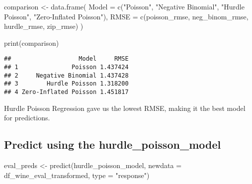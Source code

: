 \documentclass[
]{article}
\newenvironment{Shaded}{\begin{snugshade}}{\end{snugshade}}
\newcommand{\AttributeTok}[1]{\textcolor[rgb]{0.77,0.63,0.00}{#1}}
\newcommand{\FunctionTok}[1]{\textcolor[rgb]{0.00,0.00,0.00}{#1}}
\newcommand{\NormalTok}[1]{#1}
\newcommand{\OtherTok}[1]{\textcolor[rgb]{0.56,0.35,0.01}{#1}}
\newcommand{\StringTok}[1]{\textcolor[rgb]{0.31,0.60,0.02}{#1}}
\begin{document}
\begin{Shaded}
\begin{Highlighting}[]
\NormalTok{comparison }\OtherTok{\textless{}{-}} \FunctionTok{data.frame}\NormalTok{(}
  \AttributeTok{Model =} \FunctionTok{c}\NormalTok{(}\StringTok{"Poisson"}\NormalTok{, }\StringTok{"Negative Binomial"}\NormalTok{, }\StringTok{"Hurdle Poisson"}\NormalTok{, }\StringTok{"Zero{-}Inflated Poisson"}\NormalTok{),}
  \AttributeTok{RMSE =} \FunctionTok{c}\NormalTok{(poisson\_rmse, neg\_binom\_rmse, hurdle\_rmse, zip\_rmse)}
\NormalTok{)}

\FunctionTok{print}\NormalTok{(comparison)}
\end{Highlighting}
\end{Shaded}

\begin{verbatim}
##                   Model     RMSE
## 1               Poisson 1.437424
## 2     Negative Binomial 1.437428
## 3        Hurdle Poisson 1.318200
## 4 Zero-Inflated Poisson 1.451817
\end{verbatim}

Hurdle Poisson Regression gave us the lowest RMSE, making it the best
model for predictions.

\hypertarget{predict-using-the-hurdle_poisson_model}{%
\subsection{Predict using the
hurdle\_poisson\_model}\label{predict-using-the-hurdle_poisson_model}}

\begin{Shaded}
\begin{Highlighting}[]
\NormalTok{eval\_preds }\OtherTok{\textless{}{-}} \FunctionTok{predict}\NormalTok{(hurdle\_poisson\_model, }\AttributeTok{newdata =}\NormalTok{ df\_wine\_eval\_transformed, }\AttributeTok{type =} \StringTok{"response"}\NormalTok{)}
\end{Highlighting}
\end{Shaded}
\end{document}
